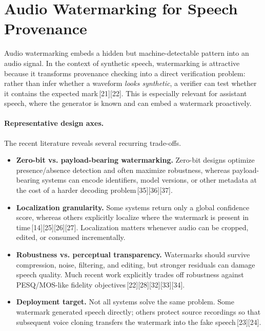 \section{Audio Watermarking for Speech Provenance}
Audio watermarking embeds a hidden but machine-detectable pattern into an audio signal. In the context of synthetic speech, watermarking is attractive because it transforms provenance checking into a direct verification problem: rather than infer whether a waveform \emph{looks synthetic}, a verifier can test whether it contains the expected mark\,[21][22]. This is especially relevant for assistant speech, where the generator is known and can embed a watermark proactively.

\paragraph{Representative design axes.}
The recent literature reveals several recurring trade-offs.
\begin{itemize}[leftmargin=1.25em]
  \item \textbf{Zero-bit vs. payload-bearing watermarking.} Zero-bit designs optimize presence/absence detection and often maximize robustness, whereas payload-bearing systems can encode identifiers, model versions, or other metadata at the cost of a harder decoding problem\,[35][36][37].
  \item \textbf{Localization granularity.} Some systems return only a global confidence score, whereas others explicitly localize where the watermark is present in time\,[14][25][26][27]. Localization matters whenever audio can be cropped, edited, or consumed incrementally.
  \item \textbf{Robustness vs. perceptual transparency.} Watermarks should survive compression, noise, filtering, and editing, but stronger residuals can damage speech quality. Much recent work explicitly trades off robustness against PESQ/MOS-like fidelity objectives\,[22][28][32][33][34].
  \item \textbf{Deployment target.} Not all systems solve the same problem. Some watermark generated speech directly; others protect source recordings so that subsequent voice cloning transfers the watermark into the fake speech\,[23][24].
\end{itemize}


